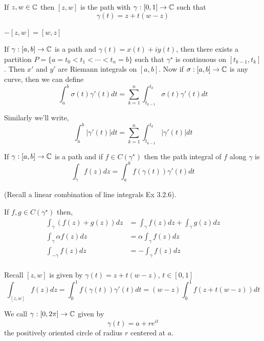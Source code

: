 \documentclass[12pt]{article}
\begin{document}
\begin{definition}
    If $z, w \in \mathbb C$ then $[z,w]$ is the path with $\gamma:[0,1] \to \mathbb C$ such that 
    \[\gamma(t) = z + t (w-z)\]
\end{definition}

\begin{remark}
    $-[z,w] = [w,z]$
\end{remark}

\begin{remark}
    If $\gamma: [a,b] \to \mathbb C$ is a path and $\gamma(t) = x(t) + iy(t)$, then there exists a partition $P = \{a = t_0 < t_1 < \cdots < t_n =b\}$ such that $\gamma^\star$ is continuous on $[t_{k-1}, t_k]$. Then $x'$ and $y'$ are Riemann integrals on $[a,b]$. Now if $\sigma : [a,b] \to \mathbb C$ is any curve, then we can define 
    \[\int_a^b \sigma(t) \gamma'(t) dt = \sum_{k=1}^n \int_{t_{k-1}}^{t_k}\sigma(t) \gamma'(t) dt\]

    Similarly we'll write, 
    \[\int_a^b |\gamma'(t)| dt = \sum_{k=1}^n \int_{t_{k-1}}^{t_k}|\gamma'(t) |dt\]
\end{remark}

\begin{definition}
    If $\gamma: [a,b] \to \mathbb C$ is a path and if $f \in C(\gamma^\star)$ then the path integral of $f$ along $\gamma$ is 
    \[\int_\gamma f(z)dz = \int_a^b f(\gamma(t))\gamma'(t) dt\]

    (Recall a linear combination of line integrals Ex 3.2.6).
\end{definition}

If $f, g \in C(\gamma^\star)$ then, 
\begin{align*}
    \int_\gamma(f(z) + g(z)) dz &= \int_\gamma f(z)dz + \int_\gamma g(z)dz \\ 
    \int_\gamma \alpha f(z) dz &= \alpha \int_\gamma f(z)dz  \\
    \int_{-\gamma}  f(z) dz &= - \int_\gamma f(z)dz  \\
\end{align*}

Recall $[z,w]$ is given by $\gamma(t) = z +t(w-z)$, $t \in [0,1]$
\[\int_{[z,w]} f(z) dz = \int_0^1 f(\gamma(t)) \gamma'(t) dt = (w-z)\int_0^1f(z+t(w-z))dt\]

\begin{remark}
    We call $\gamma : [0, 2\pi] \to \mathbb C$ given by 
    \[\gamma(t) = a +re^{it}\]
    the positively oriented circle of radius $r$ centered at $a$.
\end{remark}
\end{document}
